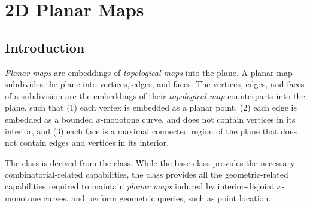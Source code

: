 
\def\Ipe#1{\def\IPEfile{#1}}

\renewcommand{\Re}{{\rm I\!\hspace{-0.025em} R}}

\def\C{{\cal C}}
\def\G{{\cal G}}
\def\F{{\cal F}}
\def\I{{\cal I}}
\def\U{{\cal U}}
\def\M{{\cal M}}
\def\eps{{\varepsilon}}
\def\bd{{\partial}}
\def\dm{{\cal D}}

\chapter{2D Planar Maps}
\label{I1_ChapterPlanarMap}
\minitoc

\section{Introduction}
\label{PM_sec:intro}

{\em Planar maps} are embeddings of {\em topological maps} into the
plane. A planar map subdivides the plane into vertices, edges, and
faces. The vertices, edges, and faces of a subdivision are the
embeddings of their {\em topological map} counterparts into the plane,
such that (1) each vertex is embedded as a planar point, (2) each edge
is embedded as a bounded $x$-monotone curve, and does not contain
vertices in its interior, and (3) each face is a maximal connected
region of the plane that does not contain edges and vertices in its
interior.

The  class is derived from the
 class. While the
 base class provides the necessary
combinatorial-related capabilities, the
 class provides all the
geometric-related capabilities required to maintain {\em planar maps}
induced by interior-disjoint $x$-monotone curves, and perform
geometric queries, such as point location.

